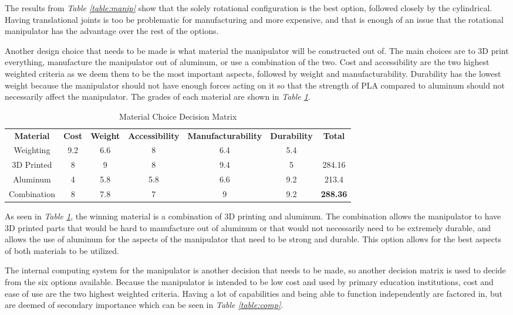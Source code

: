 The results from \emph{Table \ref{table:manip}} show that the solely rotational configuration is the best option, followed closely by the cylindrical. Having translational joints is too be problematic for manufacturing and more expensive, and that is enough of an issue that the rotational manipulator has the advantage over the rest of the options.

Another design choice that needs to be made is what material the manipulator will be constructed out of. The main choices are to 3D print everything, manufacture the manipulator out of aluminum, or use a combination of the two. Cost and accessibility are the two highest weighted criteria as we deem them to be the most important aspects, followed by weight and manufacturability. Durability has the lowest weight because the manipulator should not have enough forces acting on it so that the strength of PLA compared to aluminum should not necessarily affect the manipulator. The grades of each material are shown in \emph{Table \ref{table:mat}}.

\begin{table}[htp]
  \center
  \caption{Material Choice Decision Matrix}
  \label{table:mat}
\small\begin{tabular}{c|cccccc}
\textbf{Material} & \textbf{Cost} & \textbf{Weight} & \textbf{Accessibility} & \textbf{Manufacturability} & \textbf{Durability} & \textbf{Total} \\\normalsize
Weighting & 9.2 & 6.6 & 8 & 6.4 & 5.4 & \\\hline
3D Printed & 8 & 9 & 8 & 9.4 & 5 & 284.16 \\
Aluminum & 4 & 5.8 & 5.8 & 6.6 & 9.2 & 213.4 \\
Combination & 8 & 7.8 & 7 & 9 & 9.2 & \textbf{288.36} \\
\end{tabular}
\end{table}

As seen in \emph{Table \ref{table:mat}}, the winning material is a combination of 3D printing and aluminum. The combination allows the manipulator to have 3D printed parts that would be hard to manufacture out of aluminum or that would not necessarily need to be extremely durable, and allows the use of aluminum for the aspects of the manipulator that need to be strong and durable. This option allows for the best aspects of both materials to be utilized.

The internal computing system for the manipulator is another decision that needs to be made, so another decision matrix is used to decide from the six options available. Because the manipulator is intended to be low cost and used by primary education institutions, cost and ease of use are the two highest weighted criteria. Having a lot of capabilities and being able to function independently are factored in, but are deemed of secondary importance which can be seen in \emph{Table \ref{table:comp}}.

